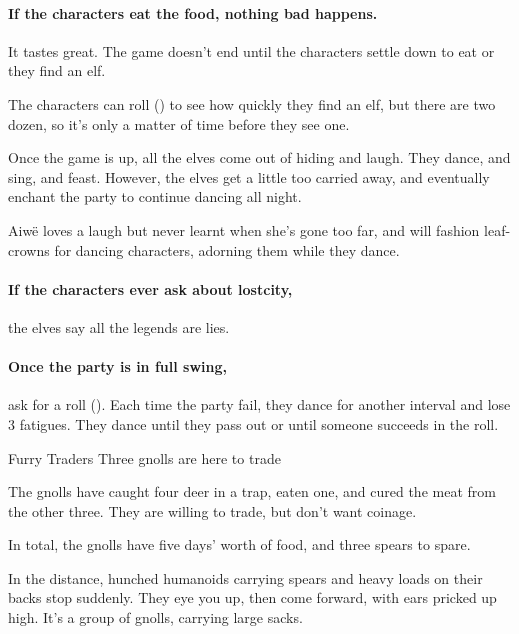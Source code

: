 \paragraph{If the characters eat the food, nothing bad happens.}
It tastes great.
The game doesn't end until the characters settle down to eat or they find an elf.

The characters can roll  (\tn[8]) to see how quickly they find an elf, but there are two dozen, so it's only a matter of time before they see one.

Once the game is up, all the elves come out of hiding and laugh.
They dance, and sing, and feast.
However, the elves get a little too carried away, and eventually enchant the party to continue dancing all night.


Aiw\"{e} loves a laugh but never learnt when she's gone too far, and will fashion leaf-crowns for dancing characters, adorning them while they dance.


\showStdSpells


\paragraph{If the characters ever ask about \gls{lostcity},}
the elves say all the legends are lies.

\paragraph{Once the party is in full swing,}
ask for a  roll (\tn[12]).
Each time the party fail, they dance for another \gls{interval} and lose 3 \glspl{fatigue}.
They dance until they pass out or until someone succeeds in the roll.

{Furry Traders}%
{Three gnolls are here to trade}%

The gnolls have caught four deer in a trap, eaten one, and cured the meat from the other three.
They are willing to trade, but don't want coinage.

In total, the gnolls have five days' worth of food, and three spears to spare.

\begin{boxtext}
  In the distance, hunched humanoids carrying spears and heavy loads on their backs stop suddenly.
  They eye you up, then come forward, with ears pricked up high.
  It's a group of gnolls, carrying large sacks.
\end{boxtext}


